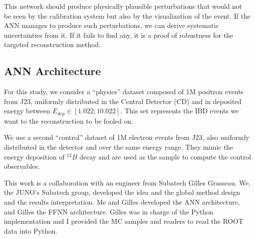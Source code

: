 \documentclass[../main.tex]{subfiles}
\begin{document}
This network should produce physically plausible perturbations that would not be seen by the calibration system but also by the visualization of the event. If the ANN manages to produce such perturbations, we can derive systematic uncertainties from it. If it fails to find any, it is a proof of robustness for the targeted reconstruction method.

\subsection{ANN Architecture}
\label{sec:janne:arch}

For this study, we consider a ``physics'' dataset composed of 1M positron events from J23, uniformly distributed in the Central Detector (CD) and in deposited energy between $E_{dep} \in [1.022; 10.022]$. This set represents the IBD events we want to the reconstruction to be fooled on.

We use a second ``control'' dataset of 1M electron events from J23, also uniformly distributed in the detector and over the same energy range. They mimic the energy deposition of $^{12}B$ decay and are used as the sample to compute the control observables.

This work is a collaboration with an engineer from Subatech Gilles Grasseau. We, the JUNO's Subatech group, developed the idea and the global method design and the results interpretation. Me and Gilles developed the ANN architecture, and Gilles the FFNN architecture. Gilles was in charge of the Python implementation and I provided the MC samples and readers to read the ROOT data into Python.
\end{document}
